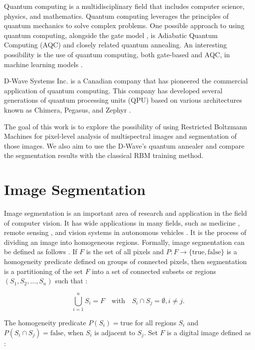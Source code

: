 \documentclass[a4paper,12pt]{article}
\begin{document}
Quantum computing is a multidisciplinary field that includes computer science, physics, and mathematics. Quantum computing leverages the principles of quantum mechanics to solve complex problems. One possible approach to using quantum computing, alongside the gate model \cite{Pereira2023}, is Adiabatic Quantum Computing (AQC) \cite{Kadowaki1998} and closely related quantum annealing. An interesting possibility is the use of quantum computing, both gate-based and AQC, in machine learning models \cite{schuld2021}. 

D-Wave Systems Inc. is a Canadian company that has pioneered the commercial application of quantum computing. This company has developed several generations of quantum processing units (QPU) based on various architectures known as Chimera, Pegasus, and Zephyr \cite{DWaveDocumentation}.

The goal of this work is to explore the possibility of using Restricted Boltzmann Machines for pixel-level analysis of multispectral images and segmentation of those images. We also aim to use the D-Wave's quantum annealer and compare the segmentation results with the classical RBM training method.

\section{Image Segmentation}\label{segmentation}

Image segmentation is an important area of research and application in the field of computer vision. It has wide applications in many fields, such as medicine \cite{Ma2024}, remote sensing \cite{Kemker2018}, and vision systems in autonomous vehicles \cite{Cakir2022}. It is the process of dividing an image into homogeneous regions. Formally, image segmentation can be defined as follows \cite{Pal1993}. If $F$ is the set of all pixels and $P: F \to \{\text{true},\text{false}\}$ is a homogeneity predicate defined on groups of connected pixels, then segmentation is a partitioning of the set $F$ into a set of connected subsets or regions $(S_{1},S_{2},\ldots,S_{n})$ such that \cite{Pal1993}:

\begin{equation}
	\label{segmentation_eq}
    \bigcup_{i=1}^{n} S_{i}=F \quad \text{with} \quad S_{i} \cap S_{j} = \emptyset, i \neq j.
\end{equation}

\noindent The homogeneity predicate $P(S_{i})=\text{true}$ for all regions $S_{i}$ and $P(S_{i} \cap S_{j})=\text{false}$, when $S_{i}$ is adjacent to $S_{j}$. Set $F$ is a digital image defined as \cite{Pal1993}:
\end{document}
